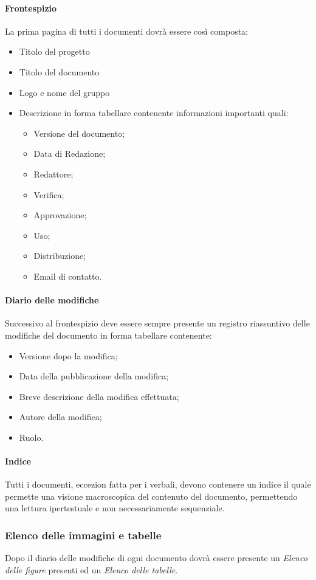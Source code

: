 \paragraph{Frontespizio}
La prima pagina di tutti i documenti dovrà essere così composta:
\begin{itemize}
	\item Titolo del progetto
	\item Titolo del documento
	\item Logo e nome del gruppo
	\item Descrizione in forma tabellare contenente informazioni importanti quali:
	\begin{itemize}
		\item Versione del documento;
		\item Data di Redazione;
		\item Redattore;
		\item Verifica;
		\item Approvazione;
		\item Uso;
		\item Distribuzione;
		\item Email di contatto.
	\end{itemize}
\end{itemize}

\paragraph{Diario delle modifiche}
Successivo al frontespizio deve essere sempre presente un registro riassuntivo delle modifiche del documento in forma tabellare contenente:
\begin{itemize}
\item Versione dopo la modifica;
\item Data della pubblicazione della modifica;
\item Breve descrizione della modifica effettuata;
\item Autore della modifica;
\item Ruolo.
\end{itemize}
\paragraph{Indice}
Tutti i documenti, eccezion fatta per i verbali, devono contenere un indice il quale permette una visione macroscopica del contenuto del documento,
permettendo una lettura ipertestuale e non necessariamente sequenziale.
 \subsubsection{Elenco delle immagini e tabelle} 
Dopo il diario delle modifiche di ogni documento dovrà essere presente un \textit{Elenco delle figure} presenti ed un \textit{Elenco delle tabelle}.

